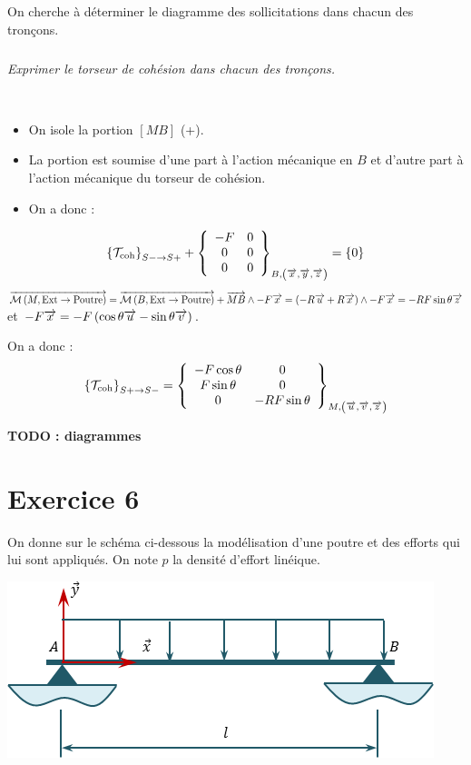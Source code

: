 \documentclass[10pt,fleqn]{article} %
\begin{document}
\begin{multicols}{2}
On cherche à déterminer le diagramme des sollicitations dans chacun des tronçons.

\subparagraph{}
\textit{Exprimer le torseur de cohésion dans chacun des tronçons.}
\ifprof
\begin{corrige}
 ~\\
\begin{itemize}[label=,font=\color{ocre}] 
\item On isole la portion $[MB]$ (+).
\item La portion est soumise d'une part à l'action mécanique en $B$ et d'autre part à l'action mécanique du torseur de cohésion.
\item On a donc : 
\end{itemize}
$$
\torseurscoh_{S-\rightarrow S+} +
 \torseurcol{-F}{0}{0}{0}{0}{0}{B,\left( \vect{x},\vect{y},\vect{z} \right)} 
 = \{0\}
$$
%
$\vectm{M}{\text{Ext}}{\text{Poutre}}
=\vectm{B}{\text{Ext}}{\text{Poutre}} + \vect{MB}  \wedge -F \vect{x} 
=\left( -R\vect{u} + R\vect{x}\right) \wedge -F \vect{x} 
=  - RF \sin \theta \vect{z}
$  et $-F \vect{x}  = -F \left( \cos \theta \vect{u}-\sin \theta \vect{v} \right) $.

On a donc :
$$
\torseurscoh_{S+\rightarrow S-} 
= 
 \torseurcol{-F\cos \theta }{F\sin \theta }{0}{0}{0}{ - RF \sin \theta}{M,\left( \vect{u},\vect{v},\vect{z} \right)} 
$$

\textbf{TODO : diagrammes}
\end{corrige}
\else 
\fi





\section*{Exercice 6}
\setcounter{subparagraph}{0}
On donne sur le schéma ci-dessous la modélisation d'une poutre et des efforts qui lui sont appliqués. On note $p$ la densité d'effort linéique.
\begin{center}
\includegraphics[width=.45\textwidth]{images/exo_05}
\end{center}


\end{multicols}
\end{document}
